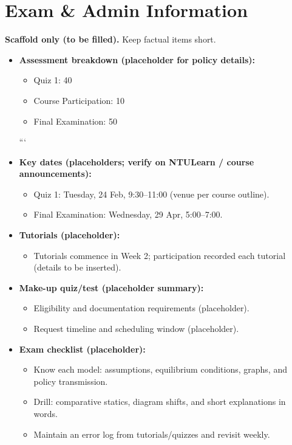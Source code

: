 \documentclass[12pt]{article}
\begin{document}
\section{Exam & Admin Information}

\noindent\textbf{Scaffold only (to be filled).} Keep factual items short.

\begin{itemize}
\item \textbf{Assessment breakdown (placeholder for policy details):}
\begin{itemize}
\item Quiz 1: 40%
\item Course Participation: 10%
\item Final Examination: 50%
\end{itemize}

```
\item \textbf{Key dates (placeholders; verify on NTULearn / course announcements):}
\begin{itemize}
    \item Quiz 1: Tuesday, 24 Feb, 9:30--11:00 (venue per course outline).
    \item Final Examination: Wednesday, 29 Apr, 5:00--7:00.
\end{itemize}

\item \textbf{Tutorials (placeholder):}
\begin{itemize}
    \item Tutorials commence in Week 2; participation recorded each tutorial (details to be inserted).
\end{itemize}

\item \textbf{Make-up quiz/test (placeholder summary):}
\begin{itemize}
    \item Eligibility and documentation requirements (placeholder).
    \item Request timeline and scheduling window (placeholder).
\end{itemize}

\item \textbf{Exam checklist (placeholder):}
\begin{itemize}
    \item Know each model: assumptions, equilibrium conditions, graphs, and policy transmission.
    \item Drill: comparative statics, diagram shifts, and short explanations in words.
    \item Maintain an error log from tutorials/quizzes and revisit weekly.
\end{itemize}


\end{itemize}
\end{document}
